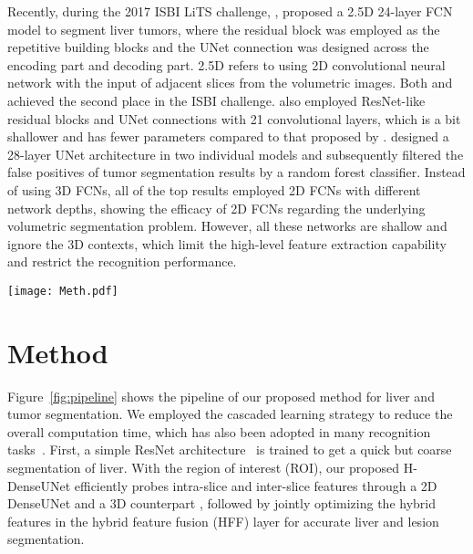 \documentclass[journal]{IEEEtran}
\begin{document}
Recently, during the 2017 ISBI LiTS challenge, \citet{han2017automatic}, proposed a 2.5D 24-layer FCN model to segment liver tumors, where the residual block was employed as the repetitive building blocks and the UNet connection was designed across the encoding part and decoding part. 
2.5D refers to using 2D convolutional neural network with the input of adjacent slices from the volumetric images. Both \citet{vorontsov2017liver} and \citet{chlebus2017neural} achieved the second place in the ISBI challenge. \citet{vorontsov2017liver} also employed ResNet-like residual blocks and UNet connections with 21 convolutional layers, which is a bit shallower and has fewer parameters compared to that proposed by \citet{han2017automatic}. \citet{chlebus2017neural} designed a 28-layer UNet architecture in two individual models and subsequently filtered the false positives of tumor segmentation results by a random forest classifier. 
Instead of using 3D FCNs, all of the top results employed 2D FCNs with different network depths, showing the efficacy of 2D FCNs regarding the underlying volumetric segmentation problem.
However, all these networks are shallow and ignore the 3D contexts, which limit the high-level feature extraction capability and restrict the recognition performance. 



\begin{figure*}[!t]
	\centering
	\texttt{[image: Meth.pdf]}
	\caption{}
	\label{fig:pipeline}\centering
\end{figure*}


\section{Method}
Figure~\ref{fig:pipeline} shows the pipeline of our proposed method for liver and tumor segmentation.
We employed the cascaded learning strategy to reduce the overall computation time, which has also been adopted in many recognition tasks~\cite{zhou2017fixed,farag2017bottom,zhou2017deep,roth2017spatial}.
First, a simple ResNet architecture~\citep{han2017automatic} is trained to get a quick but coarse segmentation of liver.
With the region of interest (ROI), our proposed H-DenseUNet efficiently probes intra-slice and inter-slice features through a 2D DenseUNet  and a 3D counterpart , followed by jointly optimizing the hybrid features in the hybrid feature fusion (HFF) layer for accurate liver and lesion segmentation.
\end{document}
